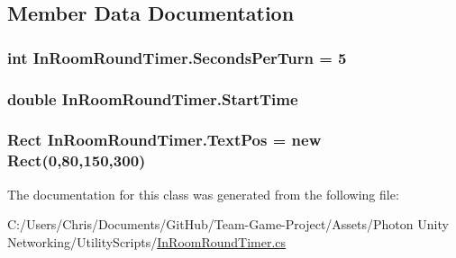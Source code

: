 \subsection{Member Data Documentation}
\subsubsection[{\texorpdfstring{Seconds\+Per\+Turn}{SecondsPerTurn}}]{\setlength{\rightskip}{0pt plus 5cm}int In\+Room\+Round\+Timer.\+Seconds\+Per\+Turn = 5}\hypertarget{class_in_room_round_timer_a3fbc46448a70dff996a45f508d3e3cc8}{}\label{class_in_room_round_timer_a3fbc46448a70dff996a45f508d3e3cc8}
\subsubsection[{\texorpdfstring{Start\+Time}{StartTime}}]{\setlength{\rightskip}{0pt plus 5cm}double In\+Room\+Round\+Timer.\+Start\+Time}\hypertarget{class_in_room_round_timer_a22ba8013f8081643dfffeb95e049a97c}{}\label{class_in_room_round_timer_a22ba8013f8081643dfffeb95e049a97c}
\subsubsection[{\texorpdfstring{Text\+Pos}{TextPos}}]{\setlength{\rightskip}{0pt plus 5cm}Rect In\+Room\+Round\+Timer.\+Text\+Pos = new Rect(0,80,150,300)}\hypertarget{class_in_room_round_timer_a1844d64936fc01a304de92179ac0cd4e}{}\label{class_in_room_round_timer_a1844d64936fc01a304de92179ac0cd4e}


The documentation for this class was generated from the following file\+:\begin{DoxyCompactItemize}
\item 
C\+:/\+Users/\+Chris/\+Documents/\+Git\+Hub/\+Team-\/\+Game-\/\+Project/\+Assets/\+Photon Unity Networking/\+Utility\+Scripts/\hyperlink{_in_room_round_timer_8cs}{In\+Room\+Round\+Timer.\+cs}\end{DoxyCompactItemize}
